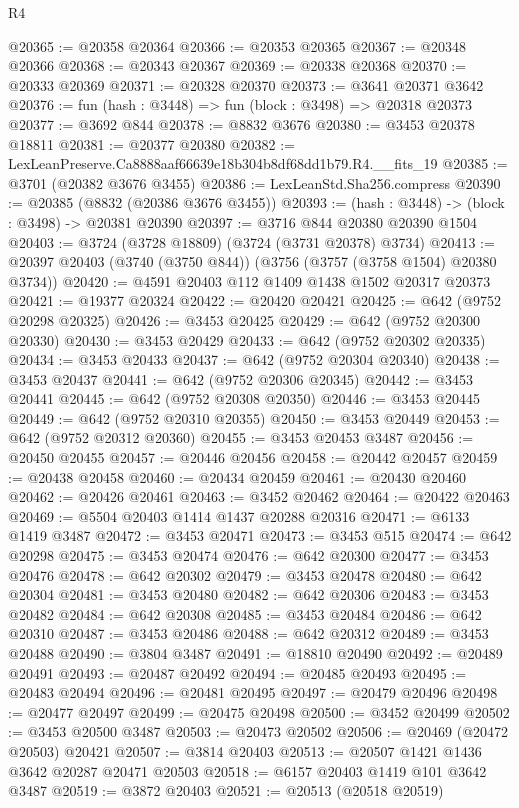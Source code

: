 \begin{lexlean}{R4}
\begin{coremodule}
@20365 := @20358 @20364
@20366 := @20353 @20365
@20367 := @20348 @20366
@20368 := @20343 @20367
@20369 := @20338 @20368
@20370 := @20333 @20369
@20371 := @20328 @20370
@20373 := @3641 @20371 @3642
@20376 := fun (hash : @3448) => fun (block : @3498) => @20318 @20373
@20377 := @3692 @844
@20378 := @8832 @3676
@20380 := @3453 @20378 @18811
@20381 := @20377 @20380
@20382 := LexLeanPreserve.Ca8888aaf66639e18b304b8df68dd1b79.R4.__fits_19
@20385 := @3701 (@20382 @3676 @3455)
@20386 := LexLeanStd.Sha256.compress
@20390 := @20385 (@8832 (@20386 @3676 @3455))
@20393 := (hash : @3448) -> (block : @3498) -> @20381 @20390
@20397 := @3716 @844 @20380 @20390 @1504
@20403 := @3724 (@3728 @18809) (@3724 (@3731 @20378) @3734)
@20413 := @20397 @20403 (@3740 (@3750 @844)) (@3756 (@3757 (@3758 @1504) @20380 @3734))
@20420 := @4591 @20403 @112 @1409 @1438 @1502 @20317 @20373
@20421 := @19377 @20324
@20422 := @20420 @20421
@20425 := @642 (@9752 @20298 @20325)
@20426 := @3453 @20425
@20429 := @642 (@9752 @20300 @20330)
@20430 := @3453 @20429
@20433 := @642 (@9752 @20302 @20335)
@20434 := @3453 @20433
@20437 := @642 (@9752 @20304 @20340)
@20438 := @3453 @20437
@20441 := @642 (@9752 @20306 @20345)
@20442 := @3453 @20441
@20445 := @642 (@9752 @20308 @20350)
@20446 := @3453 @20445
@20449 := @642 (@9752 @20310 @20355)
@20450 := @3453 @20449
@20453 := @642 (@9752 @20312 @20360)
@20455 := @3453 @20453 @3487
@20456 := @20450 @20455
@20457 := @20446 @20456
@20458 := @20442 @20457
@20459 := @20438 @20458
@20460 := @20434 @20459
@20461 := @20430 @20460
@20462 := @20426 @20461
@20463 := @3452 @20462
@20464 := @20422 @20463
@20469 := @5504 @20403 @1414 @1437 @20288 @20316
@20471 := @6133 @1419 @3487
@20472 := @3453 @20471
@20473 := @3453 @515
@20474 := @642 @20298
@20475 := @3453 @20474
@20476 := @642 @20300
@20477 := @3453 @20476
@20478 := @642 @20302
@20479 := @3453 @20478
@20480 := @642 @20304
@20481 := @3453 @20480
@20482 := @642 @20306
@20483 := @3453 @20482
@20484 := @642 @20308
@20485 := @3453 @20484
@20486 := @642 @20310
@20487 := @3453 @20486
@20488 := @642 @20312
@20489 := @3453 @20488
@20490 := @3804 @3487
@20491 := @18810 @20490
@20492 := @20489 @20491
@20493 := @20487 @20492
@20494 := @20485 @20493
@20495 := @20483 @20494
@20496 := @20481 @20495
@20497 := @20479 @20496
@20498 := @20477 @20497
@20499 := @20475 @20498
@20500 := @3452 @20499
@20502 := @3453 @20500 @3487
@20503 := @20473 @20502
@20506 := @20469 (@20472 @20503) @20421
@20507 := @3814 @20403
@20513 := @20507 @1421 @1436 @3642 @20287 @20471 @20503
@20518 := @6157 @20403 @1419 @101 @3642 @3487
@20519 := @3872 @20403
@20521 := @20513 (@20518 @20519)

\end{coremodule}
\end{lexlean}
